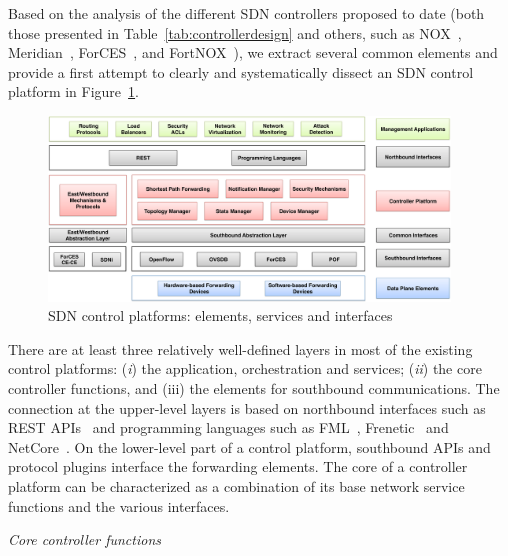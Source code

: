 Based on the analysis of the different SDN controllers proposed to date (both those presented in Table~\ref{tab:controllerdesign} and others, such as NOX~\cite{gude2008}, Meridian~\cite{banikazemi2013}, ForCES~\cite{doria2010}, and  FortNOX~\cite{porras2012}), we extract several common elements and provide a first attempt to clearly and systematically dissect an SDN control platform in Figure~\ref{fig:controlplatformarch}.

\begin{figure}[ht]
\centering
\includegraphics[width=0.95\textwidth]{figures/fig8_sdn_control_platform.pdf}
\caption{SDN control platforms: elements, services and interfaces}
\label{fig:controlplatformarch}
\end{figure}

There are at least three relatively well-defined layers in most of the existing control platforms: 
(\textit{i}) the application, orchestration and services; (\textit{ii})  the core controller functions, and 
(iii) the elements for southbound communications. The connection at the upper-level layers is based on northbound interfaces such as REST APIs~\cite{richardson2008restful}  and programming languages such as FML~\cite{hinrichs2009}, Frenetic~\cite{foster2011} and NetCore~\cite{monsanto2012}. 
On the lower-level part of a control platform, southbound APIs and protocol plugins interface the forwarding elements. %
The core of a controller platform can be characterized as a combination of its base network service functions and the various interfaces. 


\vspace{2mm}
\noindent \textit{Core controller functions}

